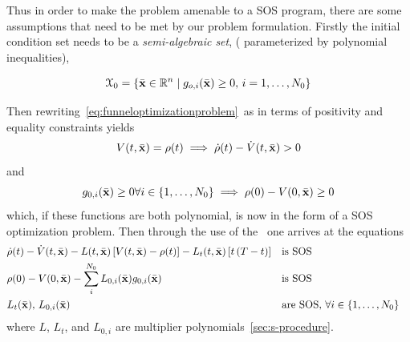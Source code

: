 Thus in order to make the problem amenable to a \ac{SOS} program, there are some
assumptions that need to be met by our problem formulation. Firstly the initial
condition set needs to be a \textit{semi-algebraic set}, (\ie{} parameterized by
polynomial inequalities),

\begin{equation}
  \mathcal{X}_0 = \lbrace\bar{\mathbf{x}} \in \mathbb{R}^n \mid g_{o,i}(\bar{\mathbf{x}}) \geq 0, \, i = 1,\ldots,N_0\rbrace
\end{equation}

Then rewriting~\cref{eq:funneloptimizationproblem}~as in terms of positivity and
equality constraints yields
\begin{equation}
  V(t,\bar{\mathbf{x}}) = \rho(t) \implies \dot{\rho}(t) - \dot{V}(t,\bar{\mathbf{x}}) > 0
\end{equation}
and
\begin{equation}
  g_{0,i}(\bar{\mathbf{x}}) \geq 0 \forall i \in \lbrace1,\ldots,N_0\rbrace \implies \rho(0) - V(0,\bar{\mathbf{x}}) \geq 0
\end{equation}
which, if these functions are both polynomial, is now in the form of a \ac{SOS}
optimization problem. Then through the use of the~ one
arrives at the equations
\begin{align}
  &\dot{\rho}(t) - \dot{V}(t,\bar{\mathbf{x}}) - L(t,\bar{\mathbf{x}})\left[ V(t,\bar{\mathbf{x}}) - \rho(t) \right] - L_{t}(t,\bar{\mathbf{x}})\left[ t\left( T - t \right) \right]  && \text{is SOS}& \label{eq:sufficient-conditions}\\
  & \rho(0) - V(0,\bar{\mathbf{x}}) - \sum_{i}^{N_{0}} L_{0,i}(\bar{\mathbf{x}})g_{0,i}(\bar{\mathbf{x}}) && \text{is SOS}& \\
  & L_{t}(\bar{\mathbf{x}}), \, L_{0,i}(\bar{\mathbf{x}}) \; &&\text{are SOS}, \, \forall i \in \lbrace1,\ldots,N_{0}\rbrace \label{eq:sufficient-conditions3} \\
\end{align} 
where \(L\), \(L_{t}\), and \(L_{0,i}\) are multiplier
polynomials~\cref{sec:s-procedure}.

